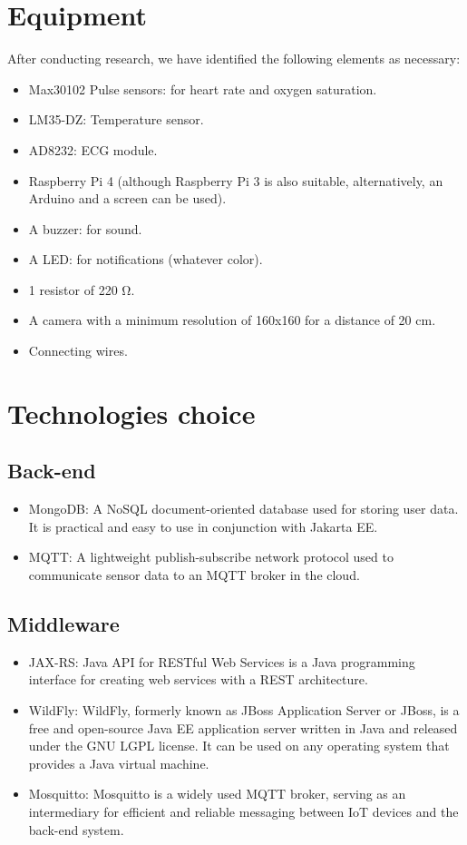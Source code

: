 \documentclass[12pt]{article}
\begin{document}
\section{Equipment}
After conducting research, we have identified the following elements as necessary:
\begin{itemize}
    \item Max30102 Pulse sensors: for heart rate and oxygen saturation.
    \item LM35-DZ: Temperature sensor.
    \item AD8232: ECG module.
    \item Raspberry Pi 4 (although Raspberry Pi 3 is also suitable, alternatively, an Arduino and a screen can be used).
    \item A buzzer: for sound.
    \item A LED: for notifications (whatever color).
    \item 1 resistor of 220 Ω.
    \item A camera with a minimum resolution of 160x160 for a distance of 20 cm.
    \item Connecting wires.
\end{itemize}


\section{Technologies choice}
\subsection{Back-end}
\begin{itemize}
    \item MongoDB: A NoSQL document-oriented database used for storing user data. It is practical and easy to use in conjunction with Jakarta EE.
    \item MQTT: A lightweight publish-subscribe network protocol used to communicate sensor data to an MQTT broker in the cloud.
\end{itemize}

\subsection{Middleware}
\begin{itemize}
    \item JAX-RS: Java API for RESTful Web Services is a Java programming interface for creating web services with a REST architecture.
    \item WildFly: WildFly, formerly known as JBoss Application Server or JBoss, is a free and open-source Java EE application server written in Java and released under the GNU LGPL license. It can be used on any operating system that provides a Java virtual machine.
    \item Mosquitto: Mosquitto is a widely used MQTT broker, serving as an intermediary for efficient and reliable messaging between IoT devices and the back-end system.
\end{itemize}
\end{document}
